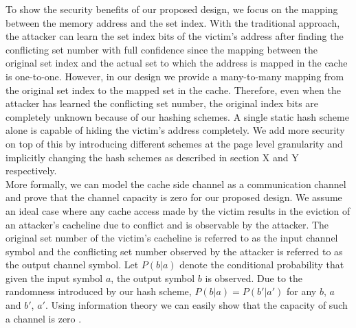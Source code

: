 To show the security benefits of our proposed design, we focus on the mapping between the memory address and the set index. With the traditional approach, the attacker can learn the set index bits of the victim's address after finding the conflicting set number with full confidence since the mapping between the original set index and the actual set to which the address is mapped in the cache is one-to-one. However, in our design we provide a many-to-many mapping from the original set index to the mapped set in the cache. Therefore, even when the attacker has learned the conflicting set number, the original index bits are completely unknown because of our hashing schemes. A single static hash scheme alone is capable of hiding the victim's address completely. We add more security on top of this by introducing different schemes at the page level granularity and implicitly changing the hash schemes as described in section X and Y respectively. \\
More formally, we can model the cache side channel as a communication channel and prove that the channel capacity is zero for our proposed design. We assume an ideal case where any cache access made by the victim results in the eviction of an attacker's cacheline due to conflict and is observable by the attacker. The original set number of the victim's cacheline is referred to as the input channel symbol and the conflicting set number observed by the attacker is referred to as the output channel symbol. Let $P(b|a)$ denote the conditional probability that given the input symbol $a$, the output symbol $b$ is observed. Due to the randomness introduced by our hash scheme, $P(b|a) = P(b'|a')$ for any $b$, $a$ and $b'$, $a'$. Using information theory we can easily show that the capacity of such a channel is zero \cite{cover2012elements}.
